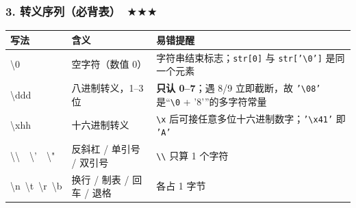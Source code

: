 \documentclass[UTF8,zihao=-4,a4paper]{ctexart}
\newcommand{\cstar}{\textcolor{deepred}{$\bigstar$}}
\begin{document}
\subsubsection*{3. 转义序列（必背表）\ \cstar\cstar\cstar}
\begin{center}\small
\begin{tabularx}{\linewidth}{>{\ttfamily}p{2.1cm} X >{\raggedright\arraybackslash}p{6.2cm}}
\toprule
写法 & 含义 & 易错提醒\\
\midrule
\textbackslash 0 & 空字符（数值 0） & 字符串结束标志；\texttt{str[0]} 与 \texttt{str['\textbackslash 0']} 是同一个元素\\
\textbackslash ddd & 八进制转义，1–3 位 & \textbf{只认 0–7}；遇 8/9 立即截断，故 \texttt{'\textbackslash 08'} 是“\texttt{\textbackslash 0} + '8'”的多字符常量\\
\textbackslash xhh & 十六进制转义 & \texttt{\textbackslash x} 后可接任意多位十六进制数字；\texttt{'\textbackslash x41'} 即 \texttt{'A'}\\
\textbackslash\textbackslash\ \ \textbackslash'\ \ \textbackslash" & 反斜杠 / 单引号 / 双引号 & \texttt{\textbackslash\textbackslash} 只算 1 个字符\\
\textbackslash n\ \textbackslash t\ \textbackslash r\ \textbackslash b & 换行 / 制表 / 回车 / 退格 & 各占 1 字节\\
\bottomrule
\end{tabularx}
\end{center}
\end{document}
